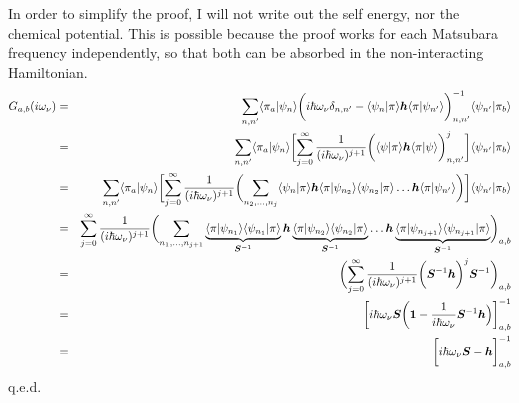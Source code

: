 \documentclass[11pt,a4paper]{report}
\begin{document}
In order to simplify the proof, I will not write out the self energy,
nor the chemical potential. This is possible because the proof works
for each Matsubara frequency independently, so that both can be
absorbed in the non-interacting Hamiltonian.
\begin{eqnarray}
G_{a,b}(i\omega_\nu)
&=&
\sum_{n,n'}\langle\pi_a|\psi_{n}\rangle
\biggl(i\hbar\omega_\nu\delta_{n,n'}
-
\langle\psi_n|\pi\rangle
\bm{h}
\langle\pi|\psi_{n'}\rangle\biggr)^{-1}_{n,n'}
\langle\psi_{n'}|\pi_b\rangle
\nonumber\\
&=&
\sum_{n,n'}\langle\pi_a|\psi_{n}\rangle
\biggl[
\sum_{j=0}^\infty
\frac{1}{(i\hbar\omega_\nu)^{j+1}}
\biggl(
\langle\psi|\pi\rangle
\bm{h}
\langle\pi|\psi\rangle\biggr)^j_{n,n'}
\biggr]\langle\psi_{n'}|\pi_b\rangle
\nonumber\\
&=&
\sum_{n,n'}\langle\pi_a|\psi_{n}\rangle
\biggl[
\sum_{j=0}^\infty
\frac{1}{(i\hbar\omega_\nu)^{j+1}}
\biggl(\sum_{n_2,\ldots,n_{j}} 
\langle\psi_{n}|\pi\rangle
\bm{h}
\langle\pi|\psi_{n_2}\rangle\langle\psi_{n_2}|\pi\rangle
\ldots
\bm{h}
\langle\pi|\psi_{n'}\rangle\biggr)\biggr]
\langle\psi_{n'}|\pi_b\rangle
\nonumber\\
&=&
\sum_{j=0}^\infty\frac{1}{(i\hbar\omega_\nu)^{j+1}}
\biggl(\sum_{n_1,\ldots,n_{j+1}} 
\underbrace{\langle\pi|\psi_{n_1}\rangle
\langle\psi_{n_1}|\pi\rangle}_{\bm{S}^{-1}}
\bm{h}
\underbrace{\langle\pi|\psi_{n_2}\rangle\langle\psi_{n_2}|\pi\rangle}_{\bm{S}^{-1}}
\ldots
\bm{h}
\underbrace{\langle\pi|\psi_{n_{j+1}}\rangle
\langle\psi_{n_{j+1}}|\pi\rangle}_{\bm{S}^{-1}}
\biggr)_{a,b}
\nonumber\\
&=&
\biggl(\sum_{j=0}^\infty\frac{1}{(i\hbar\omega_\nu)^{j+1}}
\biggl(\bm{S}^{-1}\bm{h}\biggr)^{j}\bm{S}^{-1}\biggr)_{a,b}
\nonumber\\
&=&\biggl[i\hbar\omega_\nu\bm{S}\biggl
(\bm{1}-\frac{1}{i\hbar\omega_\nu}\bm{S}^{-1}\bm{h}\Bigr)\biggr]^{-1}_{a,b}
\nonumber\\
&=&\biggl[i\hbar\omega_\nu\bm{S}-\bm{h}\biggr]^{-1}_{a,b}
\end{eqnarray}
q.e.d.


\end{document}
